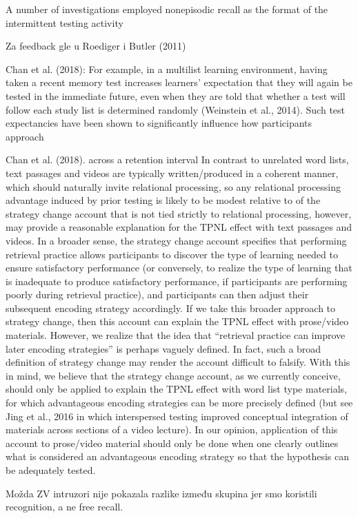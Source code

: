 \documentclass[../main.tex]{subfiles}
\begin{document}
A number of investigations employed nonepisodic recall as the format of the intermittent testing activity \cite{divisRetrievalSpeedsContext2014, pastotterRetrievalLearningFacilitates2011, }

Za feedback gle u Roediger i Butler (2011)

Chan et al. (2018):
For example, in a multilist learning environment, having taken a
recent memory test increases learners’ expectation that they will
again be tested in the immediate future, even when they are told
that whether a test will follow each study list is determined
randomly (Weinstein et al., 2014). Such test expectancies have
been shown to significantly influence how participants approach


Chan et al. (2018). across a retention interval
In contrast to unrelated word lists, text passages and videos are
typically written/produced in a coherent manner, which should naturally
invite relational processing, so any relational processing advantage
induced by prior testing is likely to be modest relative to
of the strategy change account that is not tied strictly to relational
processing, however, may provide a reasonable explanation for the
TPNL effect with text passages and videos. In a broader sense, the
strategy change account specifies that performing retrieval practice
allows participants to discover the type of learning needed to ensure
satisfactory performance (or conversely, to realize the type of learning
that is inadequate to produce satisfactory performance, if participants
are performing poorly during retrieval practice), and participants can
then adjust their subsequent encoding strategy accordingly. If we take
this broader approach to strategy change, then this account can explain
the TPNL effect with prose/video materials. However, we realize that
the idea that “retrieval practice can improve later encoding strategies”
is perhaps vaguely defined. In fact, such a broad definition of strategy
change may render the account difficult to falsify. With this in mind, we
believe that the strategy change account, as we currently conceive,
should only be applied to explain the TPNL effect with word list type
materials, for which advantageous encoding strategies can be more
precisely defined (but see Jing et al., 2016 in which interspersed testing
improved conceptual integration of materials across sections of a video
lecture). In our opinion, application of this account to prose/video
material should only be done when one clearly outlines what is considered
an advantageous encoding strategy so that the hypothesis can
be adequately tested.


Možda ZV intruzori nije pokazala razlike između skupina jer smo koristili recognition, a ne free recall.
\end{document}
